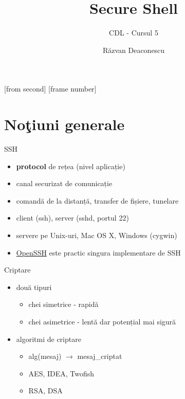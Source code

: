 \documentclass{beamer}
\title[Secure Shell]{Secure Shell}
\subtitle{CDL - Cursul 5}
\institute{ROSEdu}
\author{Răzvan Deaconescu}
\begin{document}
[from second]
[frame number]

\frame{\titlepage}

\frame{\tableofcontents}

\section{No\c{t}iuni generale}

\frame{\tableofcontents[currentsection]}

\begin{frame}{SSH}
  \begin{itemize}
    \item \textbf{protocol} de rețea (nivel aplicație)
    \item canal securizat de comunicație
    \item comandă de la distanță, transfer de fișiere, tunelare
    \item client (ssh), server (sshd, portul 22)
    \item servere pe Unix-uri, Mac OS X, Windows (cygwin)
    \item \href{http://www.openssh.com/}{OpenSSH} este practic singura
implementare de SSH
  \end{itemize}
\end{frame}

\begin{frame}{Criptare}
  \begin{itemize}
    \item două tipuri
      \begin{itemize}
        \item chei simetrice - rapidă
        \item chei asimetrice - lentă dar potențial mai sigură
      \end{itemize}
    \item algoritmi de criptare
       \begin{itemize}
         \item alg(mesaj) $\rightarrow$ mesaj\_criptat
         \item AES, IDEA, Twofish
         \item RSA, DSA
       \end{itemize}
  \end{itemize}
\end{frame}
\end{document}
